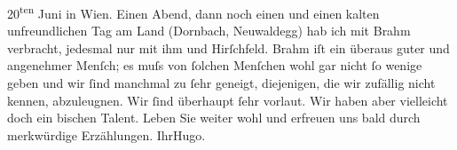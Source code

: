\begin{ledgroupsized}[t]{13cm}
                     20\textsuperscript{ten} Juni in Wien. Einen Abend, dann noch einen und einen kalten
               unfreundlichen Tag am Land (Dornbach, Neuwaldegg) hab ich mit Brahm verbracht, jedesmal {\pb}nur mit ihm und Hirſchfeld. Brahm iſt ein überaus guter und angenehmer Menſch; es muſs von ſolchen
               Menſchen wohl gar nicht ſo wenige geben und wir ſind manchmal zu ſehr geneigt,
               diejenigen, die wir zufällig nicht kennen, abzuleugnen. Wir ſind überhaupt ſehr
               vorlaut. Wir haben aber vielleicht doch ein bischen Talent.\pend
           \pstart
           Leben Sie weiter wohl und erfreuen uns bald durch merkwürdige Erzählungen.\pend
           \pstart Ihr\spacefill\mbox{Hugo.}\pend{}
         
         \endnumbering{}\end{ledgroupsized}  \newcommand{\dateiname}{L00677}\newcommand{\titel}{Hugo von Hofmannsthal an Arthur Schnitzler, 17. 5. [1897]}\newcommand{\editorInnen}{Martin Anton Müller und Gerd-Hermann Susen}
      